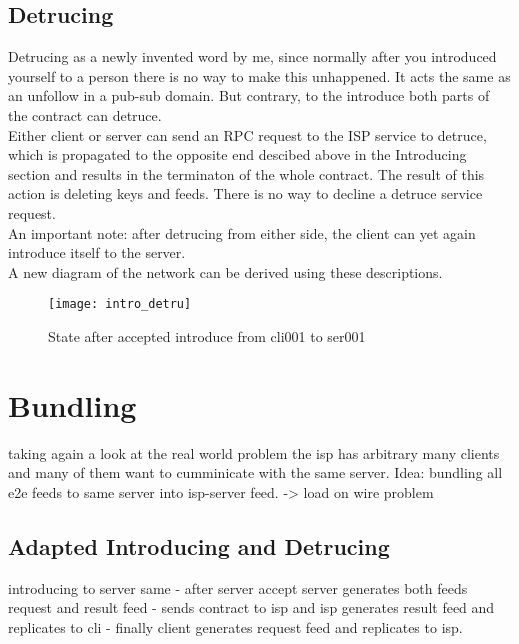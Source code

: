 \subsection{Detrucing}
Detrucing as a newly invented word by me, since normally after you introduced yourself to a person there is no way to make this unhappened. It acts the same as an unfollow in a pub-sub domain. But contrary, to the introduce both parts of the contract can detruce. \\
Either client or server can send an RPC request to the ISP service to detruce, which is propagated to the opposite end descibed above in the Introducing section and results in the terminaton of the whole contract. The result of this action is deleting keys and feeds. There is no way to decline a detruce service request.
\\
An important note: after detrucing from either side, the client can yet again introduce itself to the server.
\\
A new diagram of the network can be derived using these descriptions.
\begin{figure}
    \centering
    \texttt{[image: intro\_detru]}
    \caption{State after accepted introduce from cli001 to ser001}
    \label{fig:contract_cli_isp}
\end{figure}

\pagebreak

\section{Bundling}
taking again a look at the real world problem the isp has arbitrary many clients and many of them want to cumminicate with the same server. Idea: bundling all e2e feeds to same server into isp-server feed.
-> load on wire problem

\subsection{Adapted Introducing and Detrucing}
introducing to server same - after server accept server generates both feeds request and result feed - sends contract to isp and isp generates result feed and replicates to cli - finally client generates request feed and replicates to isp.


